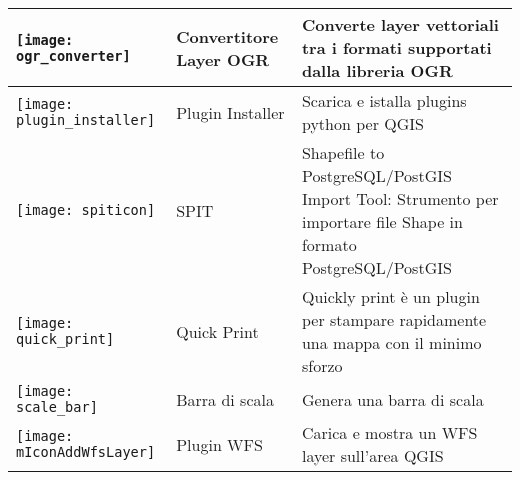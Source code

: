 \begin{minipage}{\textwidth}
\begin{table}[H]
\begin{tabular}{|l|l|p{4in}|}
\hline
\texttt{[image: ogr\_converter]}
 & Convertitore Layer OGR  \index{plugins!OGR converter} & Converte layer vettoriali tra i formati supportati dalla libreria OGR\\
\hline
\texttt{[image: plugin\_installer]}
 & Plugin Installer \index{plugins!Plugin Installer} & Scarica e istalla plugins python per QGIS\\
\hline
\texttt{[image: spiticon]}
 & SPIT \index{plugins!spit}& Shapefile to PostgreSQL/PostGIS Import Tool: Strumento per importare file Shape in formato PostgreSQL/PostGIS\\
\hline
\texttt{[image: quick\_print]}
 & Quick Print \index{plugins!quick print}& Quickly print è un plugin per stampare rapidamente una mappa con il minimo sforzo\\
\hline
\texttt{[image: scale\_bar]}
 & Barra di scala \index{plugins!scalebar}& Genera una barra di scala\\
\hline
\texttt{[image: mIconAddWfsLayer]}
 & Plugin WFS & Carica e mostra un WFS layer sull'area QGIS\\
\hline
\end{tabular}
\end{table}
\end{minipage}

\normalsize

\begin{Tip}\caption{\textsc{Settaggio dei Plugins salvati in un progetto}}
\end{Tip}
